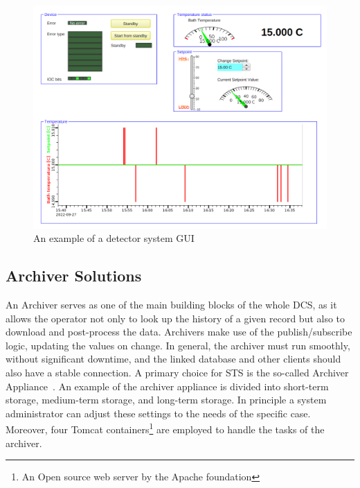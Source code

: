 \begin{figure}[!h]
\centering
\includegraphics[width=0.9\columnwidth]{Chapter4/images/lauda1.png}
\caption{An example of a detector system \gls{GUI}}
\label{fig_lauda1}
\end{figure}

\subsection{Archiver Solutions} \label{archiver}
An Archiver serves as one of the main building blocks of the whole \gls{DCS}, as it allows the operator not only to look up the history of a given record but also to download and post-process the data. Archivers make use of the publish/subscribe logic, updating the values on change. In general, the archiver must run smoothly, without significant downtime, and the linked database and other clients should also have a stable connection. A primary choice for STS is the so-called Archiver Appliance~\cite{archiver_appliance}. An example of the archiver appliance is divided into short-term storage, medium-term storage, and long-term storage. In principle a system administrator can adjust these settings to the needs of the specific case. Moreover, four Tomcat containers\footnote[1]{An Open source web server by the Apache foundation} are employed to handle the tasks of the archiver.  

